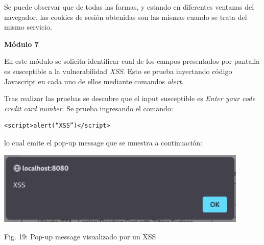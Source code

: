 \documentclass[12pt,oneside,a4paper]{book}
\begin{document}
\begin{enumerate}
\begin{enumerate}
        \hspace{20pt}
        Se puede observar que de todas las formas, y estando en diferentes ventanas del navegador, las cookies de sesión obtenidas son las mismas cuando se trata del mismo servicio.

        \vspace{2em}

        \textbf{Módulo 7}
        
        \vspace{1em}

        \hspace{20pt}
        En este módulo se solicita identificar cual de los campos presentados por pantalla es susceptible a la vulnerabilidad \textit{XSS}. Esto se prueba inyectando código Javascript en cada uno de ellos mediante comandos \textit{alert}.

        \vspace{1em}

        \hspace{20pt}
        Tras realizar las pruebas se descubre que el input susceptible es \textit{Enter your code credit card number}. Se prueba ingresando el comando:

        \begin{verbatim}
<script>alert(“XSS”)</script>
        \end{verbatim}

        lo cual emite el pop-up message que se muestra a continuación:

        \vspace{2em} 
        
        \begin{center}
            \includegraphics[width=12cm]{img/xss5.png}
            
            \vspace{0.1em}
            
            Fig. 19: Pop-up message visualizado por un XSS
        \end{center}
        

\end{enumerate}
\end{enumerate}
\end{document}
